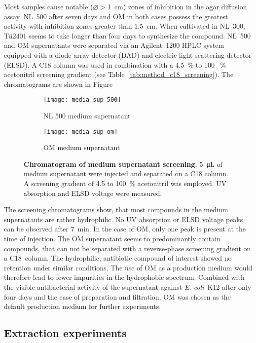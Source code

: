 	Most samples cause notable ($\varnothing>$\SI{1}{\centi\meter}) zones of inhibition in the agar diffusion assay. NL~500 after seven days and OM in both cases possess the greatest activity with inhibition zones greater than \SI{1.5}{\centi\meter}. When cultivated in NL~300, Tü2401 seems to take longer than four days to synthesize the compound. NL~500 and OM supernatants were separated via an Agilent~1200 HPLC system equipped with a diode array detector (DAD) and electric light scattering detector (ELSD). A C18 column was used in combination with a 4.5~\% to 100~ \% acetonitril screening gradient (see Table~\ref{tab:method_c18_screening}). The chromatograms are shown in Figure~
	
	\begin{figure}[htbp]
		\centering
		\begin{subfigure}{0.8\textwidth}
			\texttt{[image: media\_sup\_500]}
			\caption{NL 500 medium supernatant}
		\end{subfigure}
		\begin{subfigure}{0.8\textwidth}
			\texttt{[image: media\_sup\_om]}
			\caption{OM medium supernatant}
		\end{subfigure}
		\caption[Chromatogram of medium supernatant screening]{\textbf{Chromatogram of medium supernatant screening.} \SI{5}{\micro\liter} of medium supernatant were injected and separated on a C18 column. A screening gradient of 4.5 to 100~\% acetonitril was employed. UV absorption and ELSD voltage were measured.}
		\label{fig:results_medium_screen}
	\end{figure}
	
	The screening chromatograms show, that most compounds in the medium supernatants are rather hydrophilic. No UV absorption or ELSD voltage peaks can be observed after \SI{7}{\minute}. In the case of OM, only one peak is present at the time of injection. The OM supernatant seems to predominantly contain compounds, that can not be separated with a reverse-phase screening gradient on a C18~column. The hydrophilic, antibiotic compound of interest showed no retention under similar conditions. The use of OM as a production medium would therefore lead to fewer impurities in the hydrophobic spectrum. Combined with the visible antibacterial activity of the supernatant against \textit{E. coli}~K12 after only four days and the ease of preparation and filtration, OM was chosen as the default production medium for further experiments.
	
	\subsection{Extraction experiments}
	\label{sub:extraction_experiments}
	
